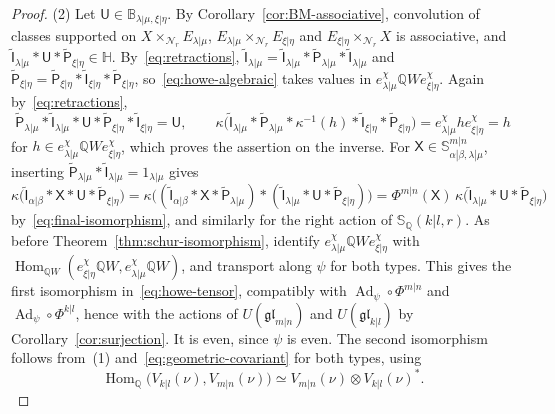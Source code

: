 \documentclass[11pt,a4paper]{amsart}
\theoremstyle{definition}
\theoremstyle{remark}
\newcommand{\Q}{\mathbb Q}
\newcommand{\N}{\mathcal N}
\newcommand{\bS}{\mathbb S}
\newcommand{\bB}{\mathbb B}
\newcommand{\bH}{\mathbb H}
\newcommand{\Hom}{\operatorname{Hom}}
\newcommand{\Ad}{\operatorname{Ad}}
\newcommand{\lm}{\lambda|\mu}
\newcommand{\xh}{\xi|\eta}
\newcommand{\ab}{\alpha|\beta}
\numberwithin{equation}{section}
\begin{document}
\begin{proof}
(2) Let $\mathsf U\in\bB_{\lm,\xh}$. By
Corollary~\ref{cor:BM-associative}, convolution of classes supported on
$X\times_{\N_r}E_{\lm}$, $E_{\lm}\times_{\N_r}E_{\xh}$ and
$E_{\xh}\times_{\N_r}X$ is associative, and
$\widetilde{\mathsf I}_{\lm}*\mathsf U*\widetilde{\mathsf P}_{\xh}\in \bH$.
By~\eqref{eq:retractions},
$\widetilde{\mathsf I}_{\lm}
=\widetilde{\mathsf I}_{\lm}*\widetilde{\mathsf P}_{\lm}*\widetilde{\mathsf I}_{\lm}$
and
$\widetilde{\mathsf P}_{\xh}
=\widetilde{\mathsf P}_{\xh}*\widetilde{\mathsf I}_{\xh}*\widetilde{\mathsf P}_{\xh}$,
so~\eqref{eq:howe-algebraic} takes values in
$e^\chi_{\lm}\Q We^\chi_{\xh}$. Again by~\eqref{eq:retractions},
$$
\widetilde{\mathsf P}_{\lm}*\widetilde{\mathsf I}_{\lm}*\mathsf U
*\widetilde{\mathsf P}_{\xh}*\widetilde{\mathsf I}_{\xh}=\mathsf U,\qquad
\kappa\bigl(\widetilde{\mathsf I}_{\lm}*\widetilde{\mathsf P}_{\lm}
*\kappa^{-1}(h)*\widetilde{\mathsf I}_{\xh}*\widetilde{\mathsf P}_{\xh}\bigr)
=e^\chi_{\lm}he^\chi_{\xh}=h
$$
for $h\in e^\chi_{\lm}\Q We^\chi_{\xh}$, which proves the assertion on the
inverse. For $\mathsf X\in\bS^{m|n}_{\ab,\lm}$, inserting
$\widetilde{\mathsf P}_{\lm}*\widetilde{\mathsf I}_{\lm}=1_{\lm}$ gives
$$
\kappa\bigl(\widetilde{\mathsf I}_{\ab}*\mathsf X*\mathsf U
*\widetilde{\mathsf P}_{\xh}\bigr)
=\kappa\bigl((\widetilde{\mathsf I}_{\ab}*\mathsf X*\widetilde{\mathsf P}_{\lm})
*(\widetilde{\mathsf I}_{\lm}*\mathsf U*\widetilde{\mathsf P}_{\xh})\bigr)
=\Phi^{m|n}(\mathsf X)\,
\kappa\bigl(\widetilde{\mathsf I}_{\lm}*\mathsf U
*\widetilde{\mathsf P}_{\xh}\bigr)
$$
by~\eqref{eq:final-isomorphism}, and similarly for the right action of
$\bS_\Q(k|l,r)$. As before Theorem~\ref{thm:schur-isomorphism}, identify
$e^\chi_{\lm}\Q We^\chi_{\xh}$ with
$\Hom_{\Q W}(e^\chi_{\xh}\Q W,e^\chi_{\lm}\Q W)$, and transport along
$\psi$ for both types. This gives the first isomorphism in~\eqref{eq:howe-tensor},
compatibly with $\Ad_\psi\circ\Phi^{m|n}$ and $\Ad_\psi\circ\Phi^{k|l}$,
hence with the actions of $U(\mathfrak{gl}_{m|n})$ and
$U(\mathfrak{gl}_{k|l})$ by Corollary~\ref{cor:surjection}. It is even,
since $\psi$ is even. The second isomorphism follows from~(1)
and~\eqref{eq:geometric-covariant} for both types, using
$$
\Hom_\Q\bigl(V_{k|l}(\nu),V_{m|n}(\nu)\bigr)
\simeq V_{m|n}(\nu)\otimes V_{k|l}(\nu)^*.
$$


\end{proof}
\end{document}
